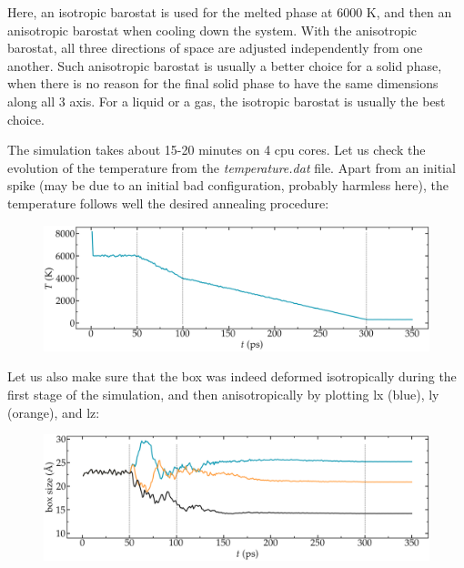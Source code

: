 \noindent \begin{tcolorbox}[colback=mylightblue!5!white,colframe=mylightblue!75!black,title=Anisotropic versus isotropic barostat]
Here, an isotropic barostat is used for the melted phase at 6000 K, and then 
an anisotropic barostat when cooling down the system. With the anisotropic 
barostat, all three directions of space are adjusted independently from one another. Such
anisotropic barostat is usually a better choice for a solid phase, 
when there is no reason for the final solid phase to
have the same dimensions along all 3 axis. For a
liquid or a gas, the isotropic barostat is usually the best choice.
\end{tcolorbox}

\noindent The simulation takes about 15-20 minutes on 4 cpu cores.
Let us check the evolution of the temperature from the \textit{temperature.dat} file.
Apart from an initial spike (may be due to an initial bad configuration, probably harmless here),
the temperature follows well the desired annealing procedure:

\begin{figure}
\includegraphics[width=\linewidth]{tutorials/level3/water-adsorption-in-silica/temperature_evolution-light.png}
\end{figure}

Let us also make sure that the box was indeed deformed isotropically during the first 
stage of the simulation, and then anisotropically by plotting lx (blue), ly (orange), and lz:

\begin{figure}
\includegraphics[width=\linewidth]{tutorials/level3/water-adsorption-in-silica/dimensions_evolution-light.png}
\end{figure}

